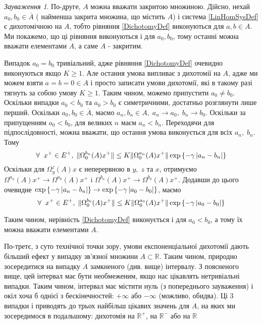\documentclass[14pt]{extarticle} %
\let\oldforall\forall
\renewcommand{\forall}{\oldforall\;}
\theoremstyle{remark}
\newtheorem{remark}{Зауваження}
\begin{document}
\begin{remark}
	По-друге, $A$ можна вважати закритою множиною. Дійсно, нехай $a_0,b_0\in\overline{A}$ (
	найменша закрита множина, що містить $A$) і система \ref{LinHomSysDef} є дихотомічною на $A$,
	тобто рівняння \ref{DichotomyDef} виконуються для $a,b\in A$. Ми покажемо, що ці рівняння виконуються і для $a_0,b_0$, тому останні можна
	вважати елементами $A$, а саме $A$ - закритим.

	Випадок $a_0=b_0$ тривіальний, адже рівняння \ref{DichotomyDef} очевидно виконуються якщо $K\geq 1$. Але остання умова випливає з дихотомії
	на $A$, адже ми можем взяти $a=b=0\in A$ і просто записати умови дихотомії, які в такому разі тягнуть за собою умову $K\geq 1$. Таким чином,
	можемо припустити $a_0\neq b_0$. Оскільки випадки $a_0<b_0$ та $a_0>b_0$ є симетричними, достатньо розглянути лише перший. Оскільки $a_0,
	b_0\in\overline{A}$, маємо $a_n,b_n\in A,\; a_n\to a_0,\;b_n\to b_0$. Оскільки за припущенням $a_0<b_0$, для великих $n$ маєм
	$a_n<b_n$. Переходячи для підпослідовності, можна вважати, що остання умова виконується для всіх $a_n,\;b_n$. Тому
	\[\forall x^+\in E^+,\;\mynorm{\Omega^{b_n}_0(A)x^+}\leq K\mynorm{\Omega_0^{a_n}(A)x^+}\exp\left\{-\gamma\myabs{a_n-b_n}\right\}\]
	Оскільки для $\Omega_y^z(A)x$ є неперервною в $y,\;z$ та $x$, отримуємо $\Omega^{a_n}(A)x^+\to\Omega^{a_0}(A)x^+$ i
	$\Omega^{b_n}(A)x^+\to\Omega^{b_0}(A)x^+$. Додавши до цього очевидне $\exp\left\{-\gamma\left|a_n-b_n\right|\right\}\to
	\exp\left\{-\gamma\left|a_0-b_0\right|\right\}$, маємо
	\[\forall x^+\in E^+,\;\mynorm{\Omega^{b_0}_0(A)x^+}\leq K\mynorm{\Omega_0^{a_0}(A)x^+}\exp\left\{-\gamma\myabs{a_0-b_0}\right\}\]

	Таким чином, нерівність \ref{DichotomyDef} виконується і для $a_0< b_0$, а тому їх можна вважати елементами $A$.

	По-третє, з суто технічної точки зору, умови експоненціальної дихотомії дають більший ефект у випадку зв’язної множини $A\subset\mathbb{R}$.
	Таким чином, природно зосередитися на випадку $A$ замкненого (див. вище) інтервалу. З поясненого вище, цей інтервал має бути необмеженим,
	якщо нас цікавлять нетривіальні випадки. Таким чином, інтервал має містити нуль (з попереднього зауваження) і окіл хоча б однієї
	з бескінечностей: $+\infty$ або $-\infty$ (можливо, обидва). Ці 3 випадки і приводять до трьох найбільш цікавих значень для $A$, на
	яких ми зосередимося в подальшому: дихотомія на $\mathbb{R}^+$, на $\mathbb{R}^-$ або на $\mathbb{R}$
\end{remark}
\end{document}
